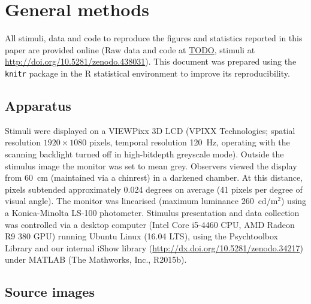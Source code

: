 \documentclass[article, 11pt,a4paper,natbib]{apa6}\usepackage[]{graphicx}\usepackage[]{color}
\begin{document}
\section{General methods}



All stimuli, data and code to reproduce the figures and statistics reported in this paper are provided online (Raw data and code at \url{TODO}, stimuli at \url{http://doi.org/10.5281/zenodo.438031}).
This document was prepared using the \texttt{knitr} package \citep{xie_knitr_2013, xie_dynamic_2015} in the R statistical environment \citep{r_core_development_team_r:_2016,wickham_dplyr:_2016,wickham_ggplot2_2009,wickham_splitapplycombine_2011, auguie_gridextra:_2016, arnold_ggthemes:_2016} to improve its reproducibility.

\subsection{Apparatus}

Stimuli were displayed on a VIEWPixx 3D LCD (VPIXX Technologies; spatial resolution $1920 \times 1080$ pixels, temporal resolution 120~Hz, operating with the scanning backlight turned off in high-bitdepth greyscale mode).
Outside the stimulus image the monitor was set to mean grey.
Observers viewed the display from 60~cm (maintained via a chinrest) in a darkened chamber.
At this distance, pixels subtended approximately 0.024 degrees on average (41 pixels per degree of visual angle).
The monitor was linearised (maximum luminance 260~$\mathrm{cd}/ \mathrm{m}^2$) using a Konica-Minolta LS-100 photometer.
Stimulus presentation and data collection was controlled via a desktop computer (Intel Core i5-4460 CPU, AMD Radeon R9 380 GPU) running Ubuntu Linux (16.04 LTS), using the Psychtoolbox Library \citep[][version 3.0.12]{pelli_videotoolbox_1997,kleiner_whats_2007,brainard_psychophysics_1997} and our internal iShow library (\url{http://dx.doi.org/10.5281/zenodo.34217}) under MATLAB (The Mathworks, Inc., R2015b).

\subsection{Source images}
\end{document}

